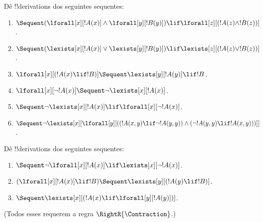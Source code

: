 \documentclass[../../../include/open-logic-section]{subfiles}
\begin{document}
\begin{prob}
Dê !!{derivation}s dos seguintes sequentes:
\begin{enumerate}
\item $\Sequent (\lforall[x][!A(x)] \land \lforall[y][!B(y)]) \lif
\lforall[z][(!A(z) \land !B(z))]$.
\item $\Sequent (\lexists[x][!A(x)] \lor \lexists[y][!B(y)]) \lif
\lexists[z][(!A(z) \lor !B(z))]$.
\item $\lforall[x][(!A(x) \lif !B)] \Sequent \lexists[y][!A(y)] \lif !B$.
\item $\lforall[x][\lnot !A(x)] \Sequent \lnot\lexists[x][!A(x)]$.
\item $\Sequent \lnot\lexists[x][!A(x)] \lif \lforall[x][\lnot !A(x)]$.
\item $\Sequent \lnot\lexists[x][\lforall[y][((!A(x,y) \lif \lnot
!A(y,y)) \land (\lnot !A(y,y) \lif !A(x,y)))]]$.
\end{enumerate}
\end{prob}

\begin{prob}
Dê !!{derivation}s dos seguintes sequentes:
\begin{enumerate}
\item $\Sequent \lnot\lforall[x][!A(x)] \lif \lexists[x][\lnot!A(x)]$.
\item $(\lforall[x][!A(x)] \lif !B) \Sequent \lexists[y][(!A(y) \lif !B)]$.
\item $\Sequent \lexists[x][(!A(x) \lif \lforall[y][!A(y)])]$.
\end{enumerate}
(Todos esses requerem a regra $\RightR{\Contraction}$.)
\end{prob}
\end{document}
